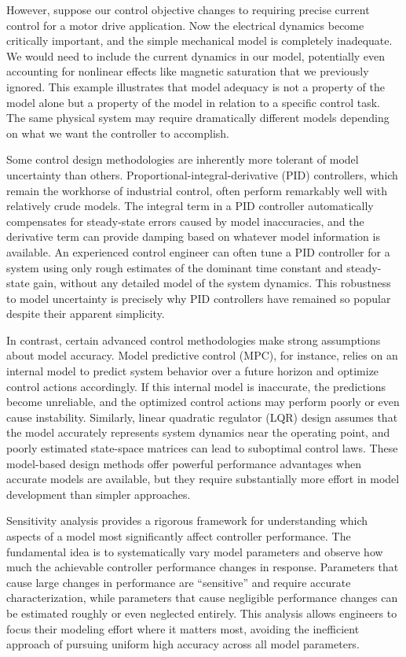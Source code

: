 However, suppose our control objective changes to requiring precise current control for a motor drive application. Now the electrical dynamics become critically important, and the simple mechanical model is completely inadequate. We would need to include the current dynamics in our model, potentially even accounting for nonlinear effects like magnetic saturation that we previously ignored. This example illustrates that model adequacy is not a property of the model alone but a property of the model in relation to a specific control task. The same physical system may require dramatically different models depending on what we want the controller to accomplish.

Some control design methodologies are inherently more tolerant of model uncertainty than others. Proportional-integral-derivative (PID) controllers, which remain the workhorse of industrial control, often perform remarkably well with relatively crude models. The integral term in a PID controller automatically compensates for steady-state errors caused by model inaccuracies, and the derivative term can provide damping based on whatever model information is available. An experienced control engineer can often tune a PID controller for a system using only rough estimates of the dominant time constant and steady-state gain, without any detailed model of the system dynamics. This robustness to model uncertainty is precisely why PID controllers have remained so popular despite their apparent simplicity.

In contrast, certain advanced control methodologies make strong assumptions about model accuracy. Model predictive control (MPC), for instance, relies on an internal model to predict system behavior over a future horizon and optimize control actions accordingly. If this internal model is inaccurate, the predictions become unreliable, and the optimized control actions may perform poorly or even cause instability. Similarly, linear quadratic regulator (LQR) design assumes that the model accurately represents system dynamics near the operating point, and poorly estimated state-space matrices can lead to suboptimal control laws. These model-based design methods offer powerful performance advantages when accurate models are available, but they require substantially more effort in model development than simpler approaches.

Sensitivity analysis provides a rigorous framework for understanding which aspects of a model most significantly affect controller performance. The fundamental idea is to systematically vary model parameters and observe how much the achievable controller performance changes in response. Parameters that cause large changes in performance are ``sensitive'' and require accurate characterization, while parameters that cause negligible performance changes can be estimated roughly or even neglected entirely. This analysis allows engineers to focus their modeling effort where it matters most, avoiding the inefficient approach of pursuing uniform high accuracy across all model parameters.

